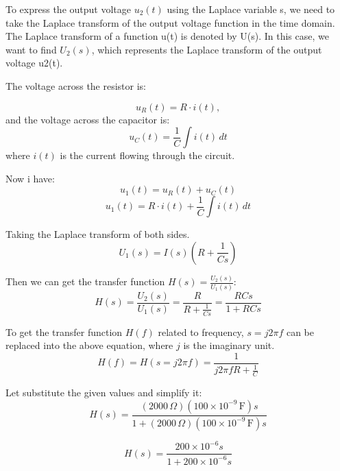 \documentclass[
	a4paper,
	11pt,
]{article}
\begin{document}
To express the output voltage \(u_2(t)\) using the Laplace variable s, we need to take the Laplace transform of the output voltage function in the time domain. The Laplace transform of a function u(t) is denoted by U(s). In this case, we want to find \(U_2(s)\), which represents the Laplace transform of the output voltage u2(t).


The voltage across the resistor is:

\begin{equation}
    u_R(t) = R \cdot i(t),
\end{equation}
and the voltage across the capacitor is: 
\begin{equation}
    u_C(t) = \frac{1}{C} \int i(t) \, dt 
\end{equation}
where \( i(t) \) is the current flowing through the circuit.

Now i have:
\begin{equation}
    u_1(t) = u_R(t) + u_C(t)
\end{equation}
\begin{equation}
    u_1(t) = R \cdot i(t) + \frac{1}{C} \int i(t) \, dt
\end{equation}

Taking the Laplace transform of both sides.
\begin{equation}
    U_1(s) = I(s) \left( R + \frac{1}{Cs} \right)
\end{equation}

Then we can get the transfer function \( H(s) = \frac{U_2(s)}{U_1(s)} \):
\begin{equation}
    H(s) = \frac{U_2(s)}{U_1(s)} = \frac{R}{R + \frac{1}{Cs}} = \frac{RCs}{1+RCs}
\end{equation}

To get the transfer function \( H(f) \) related to frequency, \( s = j2\pi f \) can be replaced into the above equation, where \( j \) is the imaginary unit.
\begin{equation}
    H(f) = H(s = j2\pi f) = \frac{1}{j2\pi f R + \frac{1}{C}}
\end{equation}

Let substitute the given values and simplify it:
\begin{equation}
    H(s) = \frac{(2000 \, \Omega)(100 \times 10^{-9} \, \text{F})s}{1 + (2000 \, \Omega)(100 \times 10^{-9} \, \text{F})s}
\end{equation}

\begin{equation}
    H(s) = \frac{200 \times 10^{-6}s}{1 + 200 \times 10^{-6}s}
\end{equation}
\end{document}
